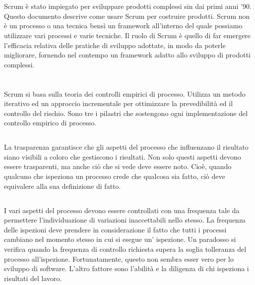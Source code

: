 \newpage
\section*{\color{Blue}{LO SCOPO}}
\label{sec:purpose}
Scrum  \`e  stato  impiegato  per  sviluppare   prodotti
complessi sin dai  primi anni '90.  Questo documento descrive  come usare Scrum
per costruire prodotti.
Scrum non \`e un processo o una tecnica bens\`i un  framework all'interno del quale  possiamo utilizzare
vari processi e varie tecniche. Il ruolo di Scrum \`e quello di far emergere l'efficacia relativa
delle  pratiche di  sviluppo adottate,  in modo  da poterle migliorare, fornendo nel contempo un
framework adatto allo sviluppo di prodotti complessi.

\section*{\color{Blue}{LA TEORIA  DI SCRUM}}
\label{sec:scrum_theory}
Scrum si basa sulla teoria dei controlli empirici di processo. Utilizza un
metodo iterativo ed un  approccio incrementale per ottimizzare la prevedibilit\`a
ed  il  controllo  del  rischio.  Sono  tre  i  pilastri  che  sostengono   ogni
implementazione  del  controllo empirico  di  processo.

\subsection*{\color{Blue}{LA PRIMA  COLONNA  \`E LA TRASPARENZA}}
\label{sec:transparency}
La  trasparenza  garantisce  che   gli  aspetti  del  processo   che
influenzano il risultato siano visibili a coloro che gestiscono i risultati. Non
solo questi aspetti  devono essere trasparenti,  ma anche ci\`o  che si vede  deve
essere noto. Cio\`e, quando  qualcuno che ispeziona un processo crede che
qualcosa sia fatto, ci\`o deve equivalere alla sua definizione di fatto.

\subsection*{\color{Blue}{LA  SECONDA  COLONNA \`E  L'ISPEZIONE}}
\label{sec:inspection}
I  vari aspetti  del  processo devono essere controllati con una frequenza tale da permettere l'individuazione di  variazioni 
inaccettabili nello stesso. La frequenza delle ispezioni deve  prendere
in considerazione  il fatto  che tutti  i processi cambiano nel momento stesso in cui si esegue un'
ispezione. Un paradosso si verifica  quando la frequenza di controllo richiesta
supera  la  soglia tolleranza del processo all'ispezione.  Fortunatamente,  questo non
sembra  esser vero per lo sviluppo di software. L'altro  fattore sono l'abilit\`a e la
diligenza di chi ispeziona i risultati del lavoro.


